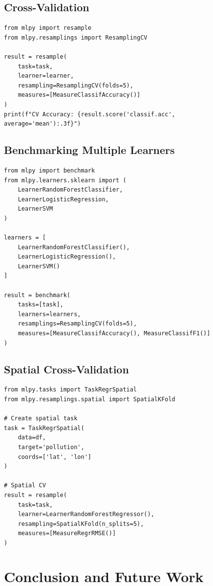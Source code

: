 \documentclass[twoside,11pt]{article}
\begin{document}
\subsection{Cross-Validation}

\begin{lstlisting}
from mlpy import resample
from mlpy.resamplings import ResamplingCV

result = resample(
    task=task,
    learner=learner,
    resampling=ResamplingCV(folds=5),
    measures=[MeasureClassifAccuracy()]
)
print(f"CV Accuracy: {result.score('classif.acc', average='mean'):.3f}")
\end{lstlisting}

\subsection{Benchmarking Multiple Learners}

\begin{lstlisting}
from mlpy import benchmark
from mlpy.learners.sklearn import (
    LearnerRandomForestClassifier,
    LearnerLogisticRegression,
    LearnerSVM
)

learners = [
    LearnerRandomForestClassifier(),
    LearnerLogisticRegression(),
    LearnerSVM()
]

result = benchmark(
    tasks=[task],
    learners=learners,
    resamplings=ResamplingCV(folds=5),
    measures=[MeasureClassifAccuracy(), MeasureClassifF1()]
)
\end{lstlisting}

\subsection{Spatial Cross-Validation}

\begin{lstlisting}
from mlpy.tasks import TaskRegrSpatial
from mlpy.resamplings.spatial import SpatialKFold

# Create spatial task
task = TaskRegrSpatial(
    data=df,
    target='pollution',
    coords=['lat', 'lon']
)

# Spatial CV
result = resample(
    task=task,
    learner=LearnerRandomForestRegressor(),
    resampling=SpatialKFold(n_splits=5),
    measures=[MeasureRegrRMSE()]
)
\end{lstlisting}

\section{Conclusion and Future Work}
\label{sec:conclusion}
\end{document}
